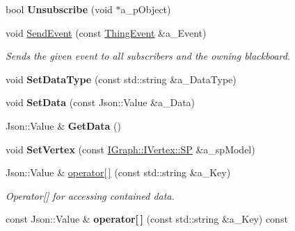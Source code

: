 \begin{DoxyCompactItemize}
bool {\bfseries Unsubscribe} (void $\ast$a\+\_\+p\+Object)
\item 
\mbox{\label{class_i_thing_a9be54bac3cce158bf0366246c6e5d8e4}} 
void \hyperlink{class_i_thing_a9be54bac3cce158bf0366246c6e5d8e4}{Send\+Event} (const \hyperlink{class_thing_event}{Thing\+Event} \&a\+\_\+\+Event)
\begin{DoxyCompactList}\small\item\em Sends the given event to all subscribers and the owning blackboard. \end{DoxyCompactList}\item 
\mbox{\label{class_i_thing_a68e0bff086c3bd17779c2c09024fc2c1}} 
void {\bfseries Set\+Data\+Type} (const std\+::string \&a\+\_\+\+Data\+Type)
\item 
\mbox{\label{class_i_thing_ae83da923f101155d5a1a4d3c6f12d608}} 
void {\bfseries Set\+Data} (const Json\+::\+Value \&a\+\_\+\+Data)
\item 
\mbox{\label{class_i_thing_a6e74a7ccac7f6f54dde27d78fae4e16d}} 
Json\+::\+Value \& {\bfseries Get\+Data} ()
\item 
\mbox{\label{class_i_thing_a3f62af9bd03230dc4c617af6c3fbf08c}} 
void {\bfseries Set\+Vertex} (const \hyperlink{class_i_graph_1_1_i_vertex_af72b9df91f110bc7824c608c10cc819c}{I\+Graph\+::\+I\+Vertex\+::\+SP} \&a\+\_\+sp\+Model)
\item 
\mbox{\label{class_i_thing_a89e188333034c61e00d02341b3a2f8d6}} 
Json\+::\+Value \& \hyperlink{class_i_thing_a89e188333034c61e00d02341b3a2f8d6}{operator\mbox{[}$\,$\mbox{]}} (const std\+::string \&a\+\_\+\+Key)
\begin{DoxyCompactList}\small\item\em Operator\mbox{[}\mbox{]} for accessing contained data. \end{DoxyCompactList}\item 
\mbox{\label{class_i_thing_a420a9501d72cd823d9725b35ee8f7565}} 
const Json\+::\+Value \& {\bfseries operator\mbox{[}$\,$\mbox{]}} (const std\+::string \&a\+\_\+\+Key) const
\item 
\mbox{\label{class_i_thing_afc3be625c06f223c51d76ecc93d91811}} 

\end{DoxyCompactItemize}
